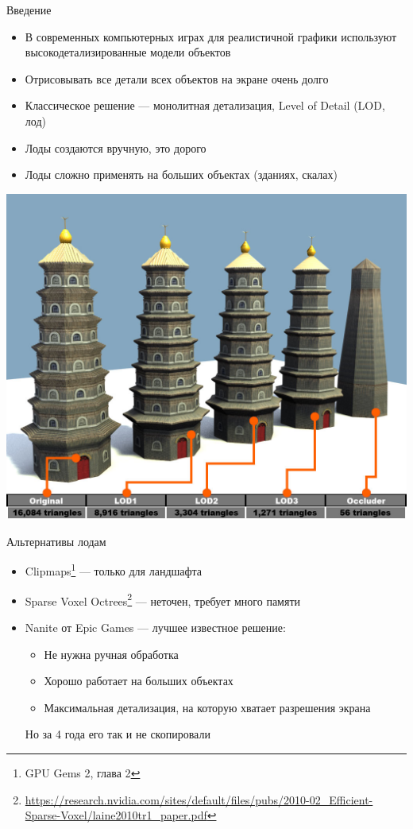 \begin{frame}{Введение}
    \begin{itemize}
        \item В современных компьютерных играх для реалистичной графики используют высокодетализированные модели объектов
        \item Отрисовывать все детали всех объектов на экране очень долго
        \item Классическое решение --- монолитная детализация, Level of Detail (LOD, лод)
        \item Лоды создаются вручную, это дорого
        \item Лоды сложно применять на больших объектах (зданиях, скалах)
    \end{itemize}
    \begin{center}
        \includegraphics[height=.4\textheight]{lod.jpg}
    \end{center}
\end{frame}

\begin{frame}{Альтернативы лодам}
    \begin{itemize}
        \item Clipmaps\footnote{GPU Gems 2, глава 2} --- только для ландшафта
        \item Sparse Voxel Octrees\footnote{\url{https://research.nvidia.com/sites/default/files/pubs/2010-02_Efficient-Sparse-Voxel/laine2010tr1_paper.pdf}} --- неточен, требует много памяти
        \item Nanite от Epic Games --- лучшее известное решение:
        \begin{itemize}
            \item Не нужна ручная обработка
            \item Хорошо работает на больших объектах
            \item Максимальная детализация, на которую хватает разрешения экрана
        \end{itemize}

        \alert{Но за 4 года его так и не скопировали}
    \end{itemize}
\end{frame}

